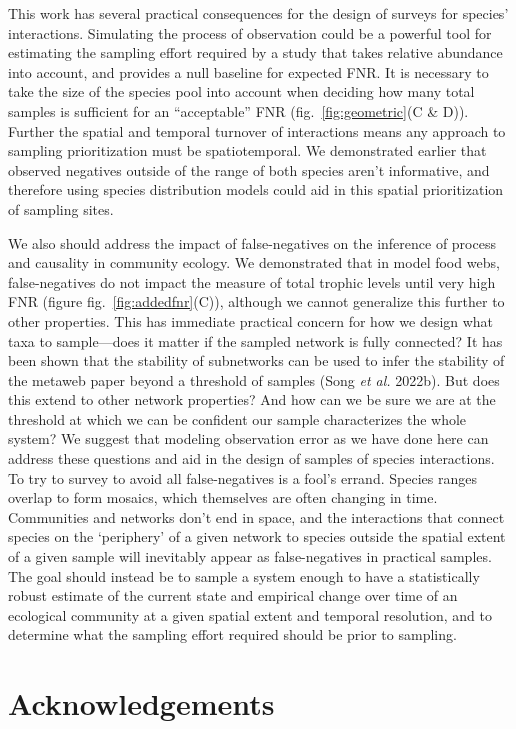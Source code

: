 \documentclass[11pt]{article}
\begin{document}
This work has several practical consequences for the design of surveys
for species' interactions. Simulating the process of observation could
be a powerful tool for estimating the sampling effort required by a
study that takes relative abundance into account, and provides a null
baseline for expected FNR. It is necessary to take the size of the
species pool into account when deciding how many total samples is
sufficient for an ``acceptable'' FNR (fig.~\ref{fig:geometric}(C \& D)).
Further the spatial and temporal turnover of interactions means any
approach to sampling prioritization must be spatiotemporal. We
demonstrated earlier that observed negatives outside of the range of
both species aren't informative, and therefore using species
distribution models could aid in this spatial prioritization of sampling
sites.

We also should address the impact of false-negatives on the inference of
process and causality in community ecology. We demonstrated that in
model food webs, false-negatives do not impact the measure of total
trophic levels until very high FNR (figure fig.~\ref{fig:addedfnr}(C)),
although we cannot generalize this further to other properties. This has
immediate practical concern for how we design what taxa to sample---does
it matter if the sampled network is fully connected? It has been shown
that the stability of subnetworks can be used to infer the stability of
the metaweb paper beyond a threshold of samples (Song \emph{et al.}
2022b). But does this extend to other network properties? And how can we
be sure we are at the threshold at which we can be confident our sample
characterizes the whole system? We suggest that modeling observation
error as we have done here can address these questions and aid in the
design of samples of species interactions. To try to survey to avoid all
false-negatives is a fool's errand. Species ranges overlap to form
mosaics, which themselves are often changing in time. Communities and
networks don't end in space, and the interactions that connect species
on the `periphery' of a given network to species outside the spatial
extent of a given sample will inevitably appear as false-negatives in
practical samples. The goal should instead be to sample a system enough
to have a statistically robust estimate of the current state and
empirical change over time of an ecological community at a given spatial
extent and temporal resolution, and to determine what the sampling
effort required should be prior to sampling.

\hypertarget{acknowledgements}{%
\section{Acknowledgements}\label{acknowledgements}}
\end{document}
